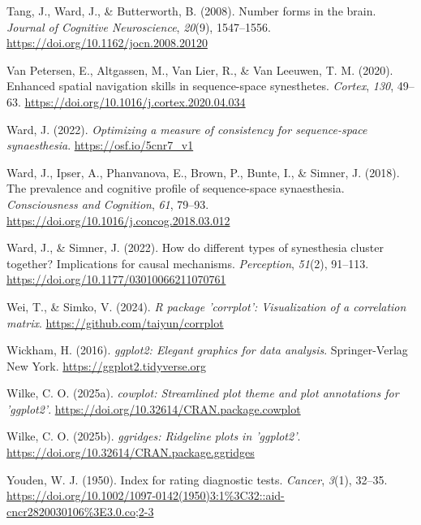 \documentclass[
  man,
  floatsintext,
  longtable,
  a4paper,
  nolmodern,
  notxfonts,
  notimes,
  colorlinks=true,linkcolor=blue,citecolor=blue,urlcolor=blue]{apa7}
\newlength{\cslhangindent}
\newenvironment{CSLReferences}[2] %
 {\begin{list}{}{%
  \setlength{\itemindent}{0pt}
  \setlength{\leftmargin}{0pt}
  \setlength{\parsep}{0pt}
  \ifodd #1
   \setlength{\leftmargin}{\cslhangindent}
   \setlength{\itemindent}{-1\cslhangindent}
  \fi
  \setlength{\itemsep}{#2\baselineskip}}}
 {\end{list}}
\begin{document}
\begin{CSLReferences}{1}{0}
Tang, J., Ward, J., \& Butterworth, B. (2008). Number forms in the
brain. \emph{Journal of Cognitive Neuroscience}, \emph{20}(9),
1547--1556. \url{https://doi.org/10.1162/jocn.2008.20120}

Van Petersen, E., Altgassen, M., Van Lier, R., \& Van Leeuwen, T. M.
(2020). Enhanced spatial navigation skills in sequence-space
synesthetes. \emph{Cortex}, \emph{130}, 49--63.
\url{https://doi.org/10.1016/j.cortex.2020.04.034}

Ward, J. (2022). \emph{Optimizing a measure of consistency for
sequence-space synaesthesia}. \url{https://osf.io/5cnr7_v1}

Ward, J., Ipser, A., Phanvanova, E., Brown, P., Bunte, I., \& Simner, J.
(2018). The prevalence and cognitive profile of sequence-space
synaesthesia. \emph{Consciousness and Cognition}, \emph{61}, 79--93.
\url{https://doi.org/10.1016/j.concog.2018.03.012}

Ward, J., \& Simner, J. (2022). How do different types of synesthesia
cluster together? Implications for causal mechanisms. \emph{Perception},
\emph{51}(2), 91--113. \url{https://doi.org/10.1177/03010066211070761}

Wei, T., \& Simko, V. (2024). \emph{R package '{corrplot}':
Visualization of a correlation matrix}.
\url{https://github.com/taiyun/corrplot}

Wickham, H. (2016). \emph{{ggplot2}: Elegant graphics for data
analysis}. Springer-Verlag New York. \url{https://ggplot2.tidyverse.org}

Wilke, C. O. (2025a). \emph{{cowplot}: Streamlined plot theme and plot
annotations for 'ggplot2'}.
\url{https://doi.org/10.32614/CRAN.package.cowplot}

Wilke, C. O. (2025b). \emph{{ggridges}: Ridgeline plots in 'ggplot2'}.
\url{https://doi.org/10.32614/CRAN.package.ggridges}

Youden, W. J. (1950). Index for rating diagnostic tests. \emph{Cancer},
\emph{3}(1), 32--35.
\url{https://doi.org/10.1002/1097-0142(1950)3:1\%3C32::aid-cncr2820030106\%3E3.0.co;2-3}

\end{CSLReferences}
\end{document}
